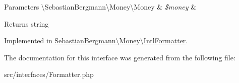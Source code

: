 \begin{DoxyParams}[1]{Parameters}
\textbackslash{}\+Sebastian\+Bergmann\textbackslash{}\+Money\textbackslash{}\+Money & {\em \$money} & \\
\hline
\end{DoxyParams}
\begin{DoxyReturn}{Returns}
string 
\end{DoxyReturn}


Implemented in \hyperlink{classSebastianBergmann_1_1Money_1_1IntlFormatter_ac3f57515d0b725ee20f900b420b2247d}{Sebastian\+Bergmann\textbackslash{}\+Money\textbackslash{}\+Intl\+Formatter}.



The documentation for this interface was generated from the following file\+:\begin{DoxyCompactItemize}
\item 
src/interfaces/Formatter.\+php\end{DoxyCompactItemize}
